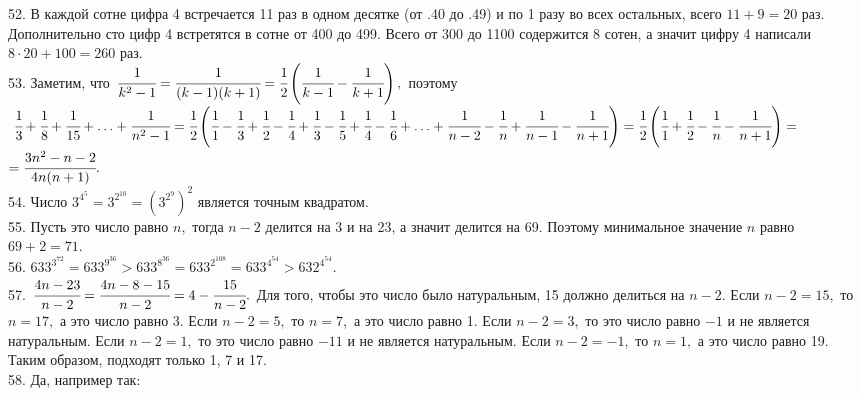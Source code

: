 \documentclass[12pt]{article}
\begin{document}
52. В каждой сотне цифра 4 встречается 11 раз в одном десятке (от .40 до .49) и по 1 разу во всех остальных, всего $11+9=20$ раз. Дополнительно сто цифр 4 встретятся в сотне от 400 до 499. Всего от 300 до 1100 содержится 8 сотен, а значит цифру 4 написали $8\cdot20+100=260$ раз.\\
53. Заметим, что $\cfrac{1}{k^2-1}=\cfrac{1}{(k-1)(k+1)}=\cfrac{1}{2}\left(\cfrac{1}{k-1}-\cfrac{1}{k+1}\right),$ поэтому
$\cfrac{1}{3}+\cfrac{1}{8}+\cfrac{1}{15}+\ldots+\cfrac{1}{n^2-1}=\cfrac{1}{2}\left(\cfrac{1}{1}-\cfrac{1}{3}+\cfrac{1}{2}-\cfrac{1}{4}+
\cfrac{1}{3}-\cfrac{1}{5}+\cfrac{1}{4}-\cfrac{1}{6}+\ldots+\cfrac{1}{n-2}-\cfrac{1}{n}+\cfrac{1}{n-1}-\cfrac{1}{n+1}\right)=
\cfrac{1}{2}\left(\cfrac{1}{1}+\cfrac{1}{2}-\cfrac{1}{n}-\cfrac{1}{n+1}\right)=$\\$=\cfrac{3n^2-n-2}{4n(n+1)}.$\\
54. Число $3^{4^5}=3^{2^{10}}=\left(3^{2^9}\right)^2$ является точным квадратом.\\
55. Пусть это число равно $n,$ тогда $n-2$ делится на 3 и на 23, а значит делится на 69. Поэтому минимальное значение $n$ равно $69+2=71.$\\
56. $633^{3^{72}}=633^{9^{36}}>633^{8^{36}}=633^{2^{108}}=633^{4^{54}}>632^{4^{54}}.$\\
57. $\cfrac{4n-23}{n-2}=\cfrac{4n-8-15}{n-2}=4-\cfrac{15}{n-2}.$ Для того, чтобы это число было натуральным, 15 должно делиться на $n-2.$ Если $n-2=15,$ то $n=17,$ а это число равно 3. Если $n-2=5,$ то $n=7,$ а это число равно 1. Если $n-2=3,$ то это число равно $-1$ и не является натуральным. Если $n-2=1,$ то это число равно $-11$ и не является натуральным. Если $n-2=-1,$ то $n=1,$ а это число равно 19. Таким образом, подходят только 1, 7 и 17.\\
58. Да, например так:
\begin{figure}[ht!]
\end{figure}\\
\end{document}
